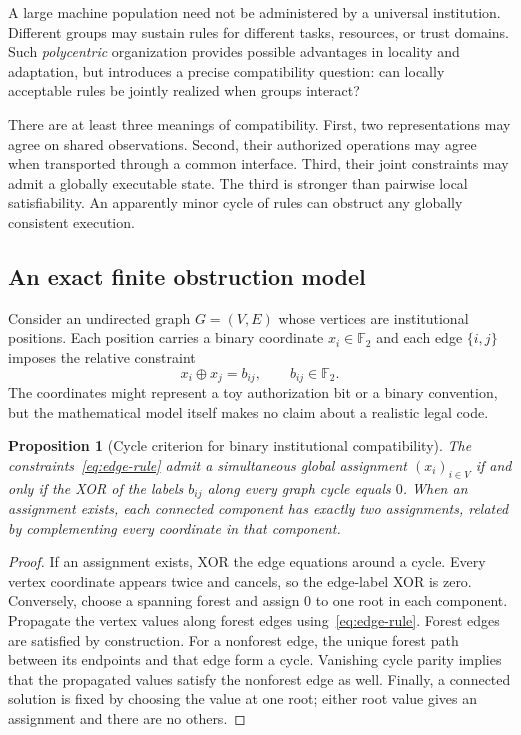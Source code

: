 \documentclass[11pt,letterpaper]{article}
\theoremstyle{plain}
\newtheorem{proposition}{Proposition}[section]
\theoremstyle{definition}
\theoremstyle{remark}
\begin{document}
A large machine population need not be administered by a universal institution. Different groups may sustain rules for different tasks, resources, or trust domains. Such \emph{polycentric} organization provides possible advantages in locality and adaptation, but introduces a precise compatibility question: can locally acceptable rules be jointly realized when groups interact?

There are at least three meanings of compatibility. First, two representations may agree on shared observations. Second, their authorized operations may agree when transported through a common interface. Third, their joint constraints may admit a globally executable state. The third is stronger than pairwise local satisfiability. An apparently minor cycle of rules can obstruct any globally consistent execution.

\subsection{An exact finite obstruction model}

Consider an undirected graph $G=(V,E)$ whose vertices are institutional positions. Each position carries a binary coordinate $x_i\in\mathbb F_2$ and each edge $\{i,j\}$ imposes the relative constraint
\begin{equation}\label{eq:edge-rule}
x_i\oplus x_j=b_{ij},\qquad b_{ij}\in\mathbb F_2.
\end{equation}
The coordinates might represent a toy authorization bit or a binary convention, but the mathematical model itself makes no claim about a realistic legal code.

\begin{proposition}[Cycle criterion for binary institutional compatibility]\label{prop:cycle}
The constraints~\eqref{eq:edge-rule} admit a simultaneous global assignment $(x_i)_{i\in V}$ if and only if the XOR of the labels $b_{ij}$ along every graph cycle equals $0$. When an assignment exists, each connected component has exactly two assignments, related by complementing every coordinate in that component.
\end{proposition}
\begin{proof}
If an assignment exists, XOR the edge equations around a cycle. Every vertex coordinate appears twice and cancels, so the edge-label XOR is zero. Conversely, choose a spanning forest and assign $0$ to one root in each component. Propagate the vertex values along forest edges using~\eqref{eq:edge-rule}. Forest edges are satisfied by construction. For a nonforest edge, the unique forest path between its endpoints and that edge form a cycle. Vanishing cycle parity implies that the propagated values satisfy the nonforest edge as well. Finally, a connected solution is fixed by choosing the value at one root; either root value gives an assignment and there are no others.
\end{proof}
\end{document}

